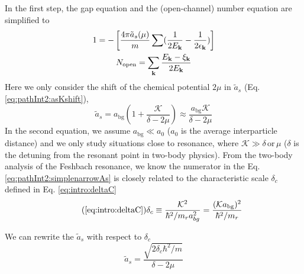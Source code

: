 \begin{unsure}
In  the first step, the gap equation and the (open-channel) number equation are simplified to 
\begin{gather}
1=-\left[\frac{4\pi{\tilde{a}_{s}(\mu)}}{m}\sum(\frac{1}{2E_{\mathbf{k}}}-\frac{1}{2\epsilon_{\mathbf{k}}})\right]\label{eq:pathInt2:narrowGapS}\\
N_{\text{open}}=\sum_{\mathbf{k}}\frac{E_{\mathbf{k}}-\xi_{\mathbf{k}}}{2E_{\mathbf{k}}}\label{eq:pathInt2:narrowNumS}
\end{gather}
Here we only consider the shift of the  chemical potential $2\mu$ in   $\tilde{a}_s$ (Eq. \ref{eq:pathInt2:asKshift}),
\begin{equation}
\tilde{a}_{s}=a_{\text{bg}}(1+\frac{\mathcal{K}}{\delta-2\mu})\approx{}\frac{a_{\text{bg}}\mathcal{K}}{\delta-2\mu}
\label{eq:pathInt2:simplenarrowAs}
\end{equation}
 In the second equation, we assume $a_{\text{bg}}\ll{}a_{0}$ ($a_{0}$ is the average interparticle distance) and we only study situations close to resonance, where $\mathcal{K}\gg{}\delta \,\text{or}\,\mu$ ($\delta$ is the detuning from the resonant point in two-body physics).  From the two-body analysis of the Feshbach resonance, we know the numerator in the Eq. \ref{eq:pathInt2:simplenarrowAs} is closely related to the characteristic scale $\delta_{c}$ defined in Eq. \ref{eq:intro:deltaC}
\begin{equation}\tag{\ref{eq:intro:deltaC}}
\delta_{c}\equiv\frac{\mathcal{K}^{2}}{\hbar^{2}/m_{r}a_{bg}^{2}}=\frac{(\mathcal{K}a_{\text{bg}})^{2}}{\hbar^{2}/m_{r}}
\end{equation}
\end{unsure}
We can rewrite the $\tilde{a}_{s}$ with respect to $\delta_{c}$
\begin{equation}\label{eq:pathInt2:asNarrowSim}
\tilde{a}_{s}=\frac{\sqrt{2\delta_{c}\hbar^{2}/m}}{\delta-2\mu}
\end{equation}

